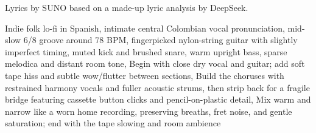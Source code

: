 
\begin{notes}
Lyrics by SUNO based on a made-up lyric analysis by DeepSeek.
\end{notes}
\begin{style}
Indie folk lo-fi in Spanish, intimate central Colombian vocal pronunciation, mid-slow 6/8 groove around 78 BPM, fingerpicked nylon-string guitar with slightly imperfect timing, muted kick and brushed snare, warm upright bass, sparse melodica and distant room tone, Begin with close dry vocal and guitar; add soft tape hiss and subtle wow/flutter between sections, Build the choruses with restrained harmony vocals and fuller acoustic strums, then strip back for a fragile bridge featuring cassette button clicks and pencil-on-plastic detail, Mix warm and narrow like a worn home recording, preserving breaths, fret noise, and gentle saturation; end with the tape slowing and room ambience
\end{style}
